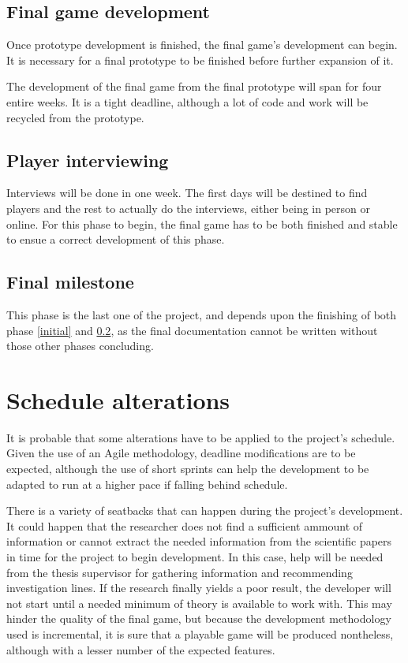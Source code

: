 \subsection{Final game development}

Once prototype development is finished, the final game's development can begin. It is necessary for a final prototype to be finished before further expansion of it.

The development of the final game from the final prototype will span for four entire weeks. It is a tight deadline, although a lot of code and work will be recycled from the prototype.

\subsection{Player interviewing}\label{playerint}

Interviews will be done in one week. The first days will be destined to find players and the rest to actually do the interviews, either being in person or online. For this phase to begin, the final game has to be both finished and stable to ensue a correct development of this phase. 

\subsection{Final milestone}

This phase is the last one of the project, and depends upon the finishing of both phase \ref{initial} and \ref{playerint}, as the final documentation cannot be written without those other phases concluding.

\section{Schedule alterations}

It is probable that some alterations have to be applied to the project's schedule. Given the use of an Agile methodology, deadline modifications are to be expected, although the use of short sprints can help the development to be adapted to run at a higher pace if falling behind schedule.

There is a variety of seatbacks that can happen during the project's development.
It could happen that the researcher does not find a sufficient ammount of information or
cannot extract the needed information from the scientific papers in time for the project
to begin development. In this case, help will be needed from the thesis supervisor for
gathering information and recommending investigation lines. If the research finally yields
a poor result, the developer will not start until a needed minimum of theory is
available to work with. This may hinder the quality of the final game, but because
the development methodology used is incremental, it is sure that a playable game
will be produced nontheless, although with a lesser number of the expected features.

